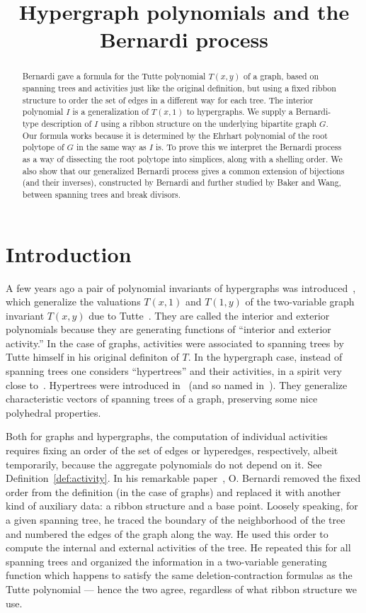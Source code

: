 \documentclass[10pt]{amsart}
\author{\firstname{Tam{\'a}s} \lastname{K{\'a}lm{\'a}n}}
\author{\firstname{Lilla} \lastname{T{\'o}thm{\'e}r{\'e}sz}}
\title{Hypergraph polynomials and the Bernardi process}
\theoremstyle{definition}\newtheorem{defi}[theo]{Definition}
\theoremstyle{remark}\newtheorem{rema}[theo]{Remark}
\begin{document}
\begin{abstract}
Bernardi gave a formula for the Tutte polynomial $T(x,y)$ of a graph, based on spanning trees and activities just like the original definition, but using a fixed ribbon structure to order the set of edges in a different way for each tree. The interior polynomial $I$ is a generalization of $T(x,1)$ to hypergraphs. We supply a Bernardi-type description of $I$ using a ribbon structure on the underlying bipartite graph $G$. Our formula works because it is determined by the Ehrhart polynomial of the root polytope of $G$ in the same way as $I$ is. To prove this we interpret the Bernardi process as a way of dissecting the root polytope into simplices, along with a shelling order. We also show that our generalized Bernardi process gives a common extension of bijections (and their inverses), constructed by Bernardi and further studied by Baker and Wang, between spanning trees and break divisors.
\end{abstract}
\maketitle
\section{Introduction}

A few years ago a pair of polynomial invariants of hypergraphs was introduced~\cite{hiperTutte}, which generalize the valuations $T(x,1)$ and $T(1,y)$ of the two-variable graph invariant $T(x,y)$ due to Tutte~\cite{Tutte}. They are called the interior and exterior polynomials because they are generating functions of ``interior and exterior activity.'' In the case of graphs, activities were associated to spanning trees by Tutte himself in his original definiton of $T$. In the hypergraph case, instead of spanning trees one considers ``hypertrees'' and their activities, in a spirit very close to~\cite{Tutte}. Hypertrees were introduced in~\cite{alex} (and so named in~\cite{hiperTutte}). They generalize characteristic vectors of spanning trees of a graph, preserving some nice polyhedral properties.

Both for graphs and hypergraphs, the computation of individual activities requires fixing an order of the set of edges or hyperedges, respectively, albeit temporarily, because the aggregate polynomials do not depend on it. See Definition~\ref{def:activity}. In his remarkable paper~\cite{Bernardi_Tutte}, O. Bernardi removed the fixed order from the definition (in the case of graphs) and replaced it with another kind of auxiliary data: a ribbon structure and a base point. Loosely speaking, for a given spanning tree, he traced the boundary of the neighborhood of the tree and numbered the edges of the graph along the way. He used this order to compute the internal and external activities of the tree. He repeated this for all spanning trees and organized the information in a two-variable generating function which happens to satisfy the same deletion-contraction formulas as the Tutte polynomial --- hence the two agree, regardless of what ribbon structure we use. 
\end{document}
